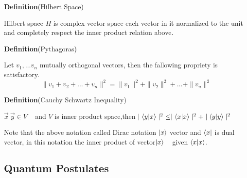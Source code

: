\textbf{Definition}{(Hilbert Space)}

Hilbert space $H$ is complex vector space  each vector in it normalized to the unit and completely  respect the inner product relation above\citep{book:4365}.

\textbf{Definition}{(Pythagoras)}

Let $v_1,\dots v_n$ mutually orthogonal vectors, then the fallowing propriety  is satisfactory.
$$\parallel v_1+v_2+\dots+v_n\parallel^2=\parallel v_1\parallel^2+\parallel v_2\parallel^2+\dots +\parallel v_n\parallel^2$$

\textbf{Definition}{(Cauchy Schwartz Inequality)}

$\vec{x} ~\vec{y} \in V $ ~ and $V$ is inner product space,then $\mid \bra{y} \ket{x} \mid^2~\leq \mid \bra{x} \ket{x} \mid^2+\mid \bra{y} \ket{y} \mid^2$

Note that the above notation called Dirac notation $\ket{x}$ vector and $\bra{x}$ is dual vector, in this notation the inner product of vector$\ket{x}$ ~ given $\bra{x}\ket{x}$.
\subsection{Quantum Postulates}


